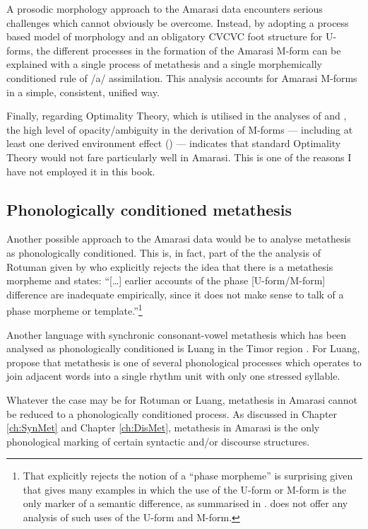 A prosodic morphology approach to the Amarasi data encounters
serious challenges which cannot obviously be overcome.
Instead, by adopting a process based model of morphology
and an obligatory CVCVC foot structure for U-forms,
the different processes in the formation of the Amarasi M-form
can be explained with a single process of metathesis
and a single morphemically conditioned rule of /a/ assimilation.
This analysis accounts for Amarasi M-forms
in a simple, consistent, unified way.

Finally, regarding Optimality Theory, which is
utilised in the analyses of \cite{mcc00} and \cite{he04},
the high level of opacity/ambiguity in the derivation of M-forms
--- including at least one derived environment effect () ---
indicates that standard Optimality Theory would not fare particularly well in Amarasi.
This is one of the reasons I have not employed it in this book.

\subsection{Phonologically conditioned metathesis}\label{sec:AltAppPhoMet}
Another possible approach to the Amarasi data would
be to analyse metathesis as phonologically conditioned.
This is, in fact, part of the the analysis of Rotuman
given by \citet[168]{mcc00} who explicitly rejects
the idea that there is a metathesis morpheme and states:
``[\ldots] earlier accounts of the phase [U-form/M-form] difference are inadequate empirically,
since it does not make sense to talk of a phase morpheme or template.''\footnote{
		That \cite{mcc00} explicitly rejects the notion of a ``phase morpheme'' is surprising
		given that \cite{ch40} gives many examples in which the use of the
		U-form or M-form is the only marker of a semantic difference,
		as summarised in .
		\cite{mcc00} does not offer any analysis of
		such uses of the U-form and M-form.}

Another language with synchronic consonant-vowel metathesis
which has been analysed as phonologically conditioned
is Luang in the Timor region \citep{tata15}.
For Luang, \citet[24]{tata15} propose that metathesis
is one of several phonological processes which operates to join
adjacent words into a single rhythm unit with only one stressed syllable.

Whatever the case may be for Rotuman or Luang,
metathesis in Amarasi cannot be reduced
to a phonologically conditioned process.
As discussed in Chapter \ref{ch:SynMet} and Chapter \ref{ch:DisMet},
metathesis in Amarasi is the only phonological marking
of certain syntactic and/or discourse structures.

